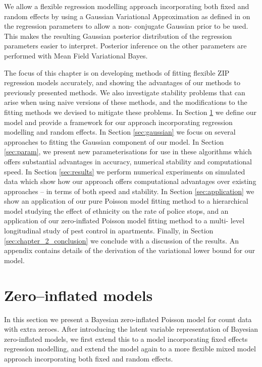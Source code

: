 We allow a flexible regression modelling approach incorporating both fixed and
random effects by using a Gaussian Variational Approximation as defined in
\cite{Ormerod2012} on the regression parameters to allow a non- conjugate
Gaussian prior to be used. This makes the resulting Gaussian posterior
distribution of the regression parameters easier to interpret. Posterior
inference on the other parameters are performed with Mean Field Variational
Bayes.


The focus of this chapter is on developing methods of fitting flexible ZIP
regression models accurately, and showing the advantages of our methods to
previously presented methods. We also investigate stability problems that can
arise when using naive versions of these methods, and the modifications to the
fitting methods we devised to mitigate these problems. In Section
\ref{sec:zero_inflated_model} we define our model and provide a framework for
our approach incorporating regression modelling and random effects. In Section
\ref{sec:gaussian} we focus on several approaches to fitting the Gaussian
component of our model. In Section \ref{sec:param}, we present new
parameterisations for use in these algorithms which offers substantial
advantages in accuracy, numerical stability and computational speed. In Section
\ref{sec:results} we perform numerical experiments on simulated data which show
how our approach offers computational advantages over existing approaches -- in
terms of both speed and stability. In Section \ref{sec:application} we show an
application of our pure Poisson model fitting method to a hierarchical model
studying the effect of ethnicity on the rate of police stops, and an
application of our zero-inflated Poisson model fitting method to a multi- level
longitudinal study of pest control in apartments. Finally, in Section
\ref{sec:chapter_2_conclusion} we conclude with a discussion of the results. An
appendix contains details of the derivation of the variational lower bound for
our model.

\section{Zero--inflated models}
\label{sec:zero_inflated_model}

In this section we present a Bayesian zero-inflated Poisson model for count
data with extra zeroes. After introducing the latent variable representation of
Bayesian zero-inflated models, we first extend this to a model incorporating
fixed effects regression modelling, and extend the model again to a more
flexible mixed model approach incorporating both fixed and random effects.


